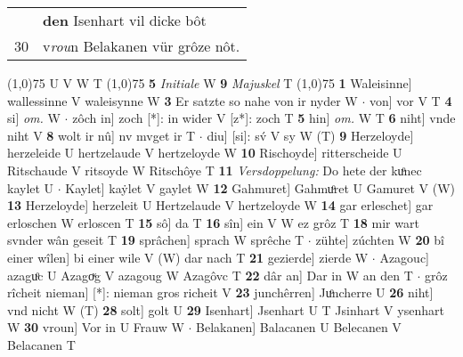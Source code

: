 \documentclass[8pt,a4paper,notitlepage]{article}
\begin{document}
\begin{table}[ht]
\begin{minipage}[t]{0.5\linewidth}
\begin{tabular}{rl}
 & \textbf{den} Isenhart vil dicke bôt\\ 
30 & v\textit{rou}n Belakanen vür grôze nôt.\\ 
\end{tabular}
\scriptsize
\line(1,0){75} \newline
U V W T \newline
\line(1,0){75} \newline
\textbf{5} \textit{Initiale} W  \textbf{9} \textit{Majuskel} T  \newline
\line(1,0){75} \newline
\textbf{1} Waleisinne] wallessinne V waleisynne W \textbf{3} Er satzte so nahe von ir nyder W  $\cdot$ von] vor V T \textbf{4} si] \textit{om.} W  $\cdot$ zôch in] zoch [*]: in wider V [z*]: zoch T \textbf{5} hin] \textit{om.} W T \textbf{6} niht] vnde niht V \textbf{8} wolt ir nû] nv mvget ir T  $\cdot$ diu] [si]: sv́ V sy W (T) \textbf{9} Herzeloyde] herzeleide U hertzelaude V hertzeloyde W \textbf{10} Rischoyde] ritterscheide U Ritschaude V ritsoyde W Ritschôye T \textbf{11} \textit{Versdoppelung:} Do hete der kuͦnec kaylet U   $\cdot$ Kaylet] kaẏlet V gaylet W \textbf{12} Gahmuret] Gahmuͦret U Gamuret V (W) \textbf{13} Herzeloyde] herzeleit U Hertzelaude V hertzeloyde W \textbf{14} gar erleschet] gar erloschen W erloscen T \textbf{15} sô] da T \textbf{16} sîn] ein V W ez grôz T \textbf{18} mir wart svnder wân geseit T \textbf{19} sprâchen] sprach W sprêche T  $\cdot$ zühte] zúchten W \textbf{20} bî einer wîlen] bi einer wile V (W) dar nach T \textbf{21} gezierde] zierde W  $\cdot$ Azagouc] azaguͦc U Azagoͮg V azagoug W Azagôvc T \textbf{22} dâr an] Dar in W an den T  $\cdot$ grôz rîcheit nieman] [*]: nieman gros richeit V \textbf{23} junchêrren] Juͦncherre U \textbf{26} niht] vnd nicht W (T) \textbf{28} solt] golt U \textbf{29} Isenhart] Jsenhart U T Jsinhart V ysenhart W \textbf{30} vroun] Vor in U Frauw W  $\cdot$ Belakanen] Balacanen U Belecanen V Belacanen T \newline
\end{minipage}
\end{table}
\end{document}
